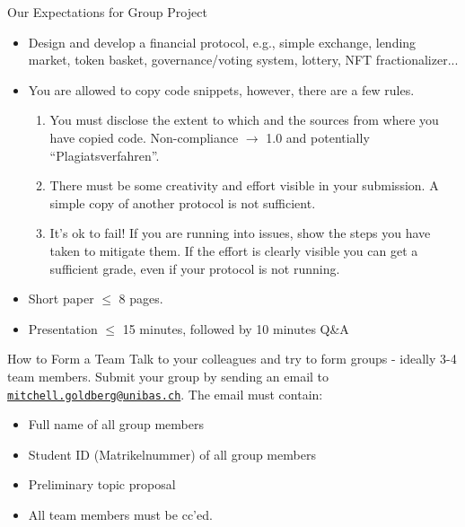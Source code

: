 \documentclass[handout]{beamer}
\begin{document}
\begin{frame}{Our Expectations for Group Project}
	\begin{itemize}
		\item<1-> \color{focus}Design and develop a financial protocol\color{black}, e.g., simple exchange, lending market, token basket, governance/voting system, lottery, NFT fractionalizer...
		\item<2-> You are \color{focus} allowed to copy code \color{black} snippets, however, there are a few rules.
		\begin{enumerate}
			\item<3-> \color{focus} You must disclose \color{black} the \color{focus} extent \color{black} to which and the \color{focus} sources \color{black} from where you have copied code. Non-compliance $\rightarrow$ 1.0 and potentially ``Plagiatsverfahren''. \vspace{0.35em}
			\item<4-> There must be some \color{focus} creativity and effort \color{black} visible in your submission. A simple copy of another protocol is not sufficient.\vspace{0.35em}
			\item<5-> \color{focus} It's ok to fail! \color{black} If you are running into issues, show the steps you have taken to mitigate them. If the effort is clearly visible you can get a sufficient grade, even if your protocol is not running.
		\end{enumerate}
		\item<6-> Short paper $\leq$ 8 pages. 
		\item<7-> Presentation $\leq$ 15 minutes, followed by 10 minutes Q\&A
	\end{itemize}
\end{frame}

\begin{frame}{How to Form a Team}
\label{TEAM}
	Talk to your colleagues and try to form groups - ideally 3-4 team members. Submit your group by sending an email to \href{mailto:mitchell.goldberg@unibas.ch?subject=Group\%20SCDF}{\texttt{mitchell.goldberg@unibas.ch}}. The email must contain:
	\begin{itemize}
		\item<2-> Full name of all group members
		\item<3-> Student ID (Matrikelnummer) of all group members
		\item<4-> Preliminary topic proposal
		\item<5-> All team members must be cc'ed.
	\end{itemize}

\vspace{1.5em}
\end{frame}
\end{document}

